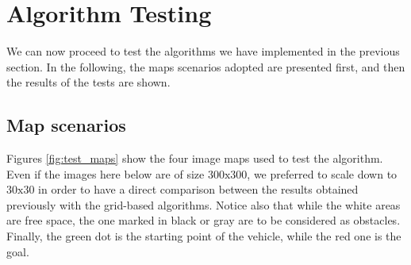 \section{Algorithm Testing}
\label{sec:algorithm_testing}

We can now proceed to test the algorithms we have implemented in the previous section.
In the following, the maps scenarios adopted are presented first, and then the results of the tests are shown.

\subsection{Map scenarios}
\label{subsec:map_scenarios}

Figures \ref{fig:test_maps} show the four image maps used to test the algorithm.
Even if the images here below are of size $300\text{x}300$, we preferred to scale down to $30\text{x}30$ in order to have a direct comparison between the results obtained previously with the grid-based algorithms.
Notice also that while the white areas are free space, the one marked in black or gray are to be considered as obstacles.
Finally, the green dot is the starting point of the vehicle, while the red one is the goal.

